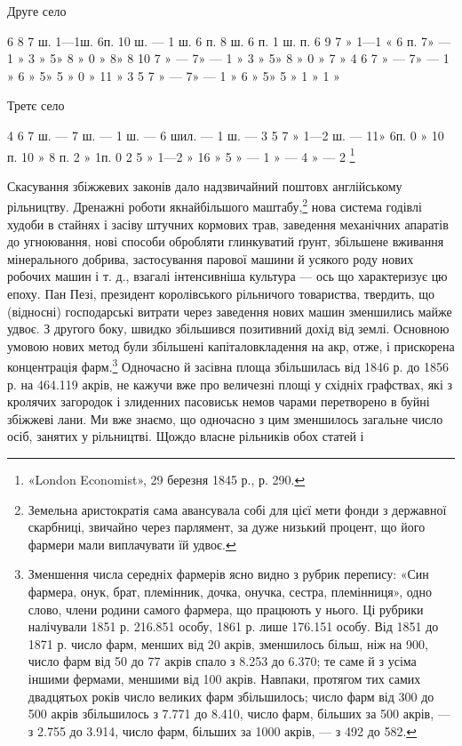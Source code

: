 Друге село

6    8    7 ш.    1—1ш. 6п.    10 ш. —  1 ш. 6       п.    8 ш. 6        п.  1 ш.    п.
6    9    7  »     1—1 «  6 п.     7»      —  1 »    3 »    5»     8 »    0 »    8»
8    10  7  »        —                  7»      —  1 »    3 »    5»     8 »    0 »    7
 »
4    6    7  »        —                  7»      —  1 »     6 »   5»     5 »    0 »  11
 »
3    5    7  »        —                  7»      —  1 »     6 »   5»     5 »    1 »    1
  »

Третє село

4    6    7 ш.         —         7 ш.   —     1 ш.    —       6  шил. —     1 ш.       —
3    5    7  »  1—2 ш. —   11»     6п.   0 »    10 п.   10  »       8 п.  2 »     1п.
0    2    5  »  1—2 » 16 »  5  »     —     1 »     —         4   »    —        2 \footnote{
«London Economist», 29 березня 1845 р., р. 290.
}

Скасування збіжжевих законів дало надзвичайний поштовх
англійському рільництву. Дренажні роботи якнайбільшого маштабу,\footnote{
Земельна аристократія сама авансувала собі для цієї мети фонди
з державної скарбниці, звичайно через парлямент, за дуже низький
процент, що його фармери мали виплачувати їй удвоє.
}
нова система годівлі худоби в стайнях і засіву штучних
кормових трав, заведення механічних апаратів до угноювання,
нові способи обробляти глинкуватий ґрунт, збільшене вживання
мінерального добрива, застосування парової машини й
усякого роду нових робочих машин і т. д., взагалі інтенсивніша
культура — ось що характеризує цю епоху. Пан Пезі, президент
королівського рільничого товариства, твердить, що (відносні)
господарські витрати через заведення нових машин зменшились
майже удвоє. З другого боку, швидко збільшився позитивний
дохід від землі. Основною умовою нових метод були збільшені
капіталовкладення на акр, отже, і прискорена концентрація
фарм.\footnote{
Зменшення числа середніх фармерів ясно видно з рубрик перепису:
«Син фармера, онук, брат, племінник, дочка, онучка, сестра, племінниця»,
одно слово, члени родини самого фармера, що працюють у
нього. Ці рубрики налічували 1851 р. 216.851 особу, 1861 р. лише 176.151
особу. Від 1851 до 1871 р. число фарм, менших від 20 акрів, зменшилось
більш, ніж на 900, число фарм від 50 до 77 акрів спало з 8.253 до 6.370;
те саме й з усіма іншими фермами, меншими від 100 акрів. Навпаки,
протягом тих самих двадцятьох років число великих фарм збільшилось;
число фарм від 300 до 500 акрів збільшилось з 7.771 до 8.410, число
фарм, більших за 500 акрів, — з 2.755 до 3.914, число фарм, більших
за 1000 акрів, — з 492 до 582.
} Одночасно й засівна площа збільшилась від 1846 р.
до 1856 р. на 464.119 акрів, не кажучи вже про величезні площі
у східніх графствах, які з кролячих загородок і злиденних пасовиськ
немов чарами перетворено в буйні збіжжеві лани. Ми вже
знаємо, що одночасно з цим зменшилось загальне число осіб,
занятих у рільництві. Щождо власне рільників обох статей і
\parbreak{}  %
